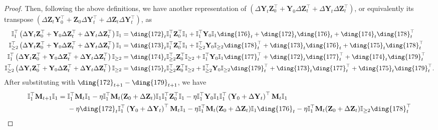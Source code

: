 \documentclass{article}
\theoremstyle{plain}
\theoremstyle{remark}
\def\bY{\mathbf{Y}}
\def\bZ{\mathbf{Z}}
\newcommand{\cc}[1]{\text{\ding{\number\numexpr#1 + 171\relax}}}
\begin{document}
\begin{proof}
    Then, following the above definitions, we have another representation of $\left(\Delta \bY_t \bZ_0^\top + \bY_0 \Delta\bZ_t^\top + \Delta\bY_t\Delta\bZ_t^\top\right)$, or equivalently its transpose $\left(\Delta\bZ_t\bY_0^\top + \bZ_0\Delta\bY_t^\top + \Delta\bZ_t\Delta\bY_t^\top\right)$, as 
    \begin{align}
        \mathbb{I}_1^\top\left(\Delta \bY_t \bZ_0^\top + \bY_0 \Delta\bZ_t^\top + \Delta\bY_t\Delta\bZ_t^\top\right)\mathbb{I}_1 
        &=
        \cc{1}_t\mathbb{I}_1^\top \bZ_0^\top\mathbb{I}_{1}+\mathbb{I}_1^\top \bY_0 \mathbb{I}_1 \cc{5}_t + \cc{1}_t\cc{5}_t + \cc{3}_t\cc{7}_t^\top \\
        \mathbb{I}_{\ge2}^\top\left(\Delta \bY_t \bZ_0^\top + \bY_0 \Delta\bZ_t^\top + \Delta\bY_t\Delta\bZ_t^\top\right)\mathbb{I}_1 
        &=
        \cc{2}_t\mathbb{I}_1^\top \bZ_0^\top\mathbb{I}_{1}+\mathbb{I}_{\ge2}^\top \bY_0 \mathbb{I}_{\ge2} \cc{7}_t^\top + \cc{2}_t\cc{5}_t + \cc{4}_t\cc{7}_t^\top \\
        \mathbb{I}_{1}^\top\left(\Delta \bY_t \bZ_0^\top + \bY_0 \Delta\bZ_t^\top + \Delta\bY_t\Delta\bZ_t^\top\right)\mathbb{I}_{\ge2} 
        &=
        \cc{3}_t\mathbb{I}_{\ge2}^\top \bZ_0^\top\mathbb{I}_{\ge2}+\mathbb{I}_{1}^\top \bY_0 \mathbb{I}_{1} \cc{6}_t^\top + \cc{1}_t\cc{6}_t^\top + \cc{3}_t\cc{8}_t^\top \\
        \mathbb{I}_{\ge2}^\top\left(\Delta \bY_t \bZ_0^\top + \bY_0 \Delta\bZ_t^\top + \Delta\bY_t\Delta\bZ_t^\top\right)\mathbb{I}_{\ge2}
        &=
        \cc{4}_t\mathbb{I}_{\ge2}^\top \bZ_0^\top\mathbb{I}_{\ge2}+\mathbb{I}_{\ge2}^\top \bY_0 \mathbb{I}_{\ge2} \cc{8}_t^\top + \cc{2}_t\cc{6}_t^\top + \cc{4}_t\cc{8}_t^\top.
    \end{align}
     After substituting with $\cc{1}_{t+1}-\cc{8}_{t+1}$, we have
    \begin{align*}
        \mathbb{I}_{1}^\top\mathbf{M}_{t+1} \mathbb{I}_{1}
        &=
            \mathbb{I}_{1}^\top\mathbf{M}_{t} \mathbb{I}_{1}
            - \eta\mathbb{I}_{1}^\top \mathbf{M}_{t} (\bZ_0+\Delta\bZ_t)\mathbb{I}_{1}\mathbb{I}_{1}^\top \bZ_0^\top\mathbb{I}_{1} 
            - \eta \mathbb{I}_{1}^\top \bY_0 \mathbb{I}_{1}\mathbb{I}_{1}^\top \left(\bY_0+\Delta\bY_t\right)^\top \mathbf{M}_{t} \mathbb{I}_{1}  \\
        &~~~~ 
            -\eta \cc{1}_t \mathbb{I}_{1}^\top\left(\bY_0+\Delta\bY_t\right)^\top\mathbf{M}_{t}\mathbb{I}_{1} 
            - \eta \mathbb{I}_{1}^\top\mathbf{M}_{t}(\bZ_0+\Delta\bZ_t)\mathbb{I}_1\cc{5}_t 
            - \eta\mathbb{I}_{1}^\top\mathbf{M}_{t}(\bZ_0+\Delta\bZ_t)\mathbb{I}_{\ge 2}\cc{7}_t^\top \\

\end{align*}
\end{proof}
\end{document}
